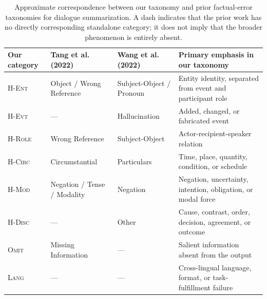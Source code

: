 \documentclass[11pt]{article}
\begin{document}
\begin{table}[t]
\centering
\scriptsize
\setlength{\tabcolsep}{4pt}
\begin{tabularx}{\textwidth}{@{}lXXX@{}}
\toprule
Our category & Tang et al. (2022) & Wang et al. (2022) & Primary emphasis in our taxonomy \\
\midrule
\textsc{H-Ent}  & Object / Wrong Reference & Subject-Object / Pronoun & Entity identity, separated from event and participant role \\
\textsc{H-Evt}  & --- & Hallucination & Added, changed, or fabricated event \\
\textsc{H-Role} & Wrong Reference & Subject-Object & Actor-recipient-speaker relation \\
\textsc{H-Circ} & Circumstantial & Particulars & Time, place, quantity, condition, or schedule \\
\textsc{H-Mod}  & Negation / Tense / Modality & Negation & Negation, uncertainty, intention, obligation, or modal force \\
\textsc{H-Disc} & --- & Other & Cause, contrast, order, decision, agreement, or outcome \\
\textsc{Omit}   & Missing Information & --- & Salient information absent from the output \\
\textsc{Lang}   & --- & --- & Cross-lingual language, format, or task-fulfillment failure \\
\bottomrule
\end{tabularx}
\caption{Approximate correspondence between our taxonomy and prior factual-error taxonomies for dialogue summarization. A dash indicates that the prior work has no directly corresponding standalone category; it does not imply that the broader phenomenon is entirely absent.}
\label{tab:taxonomy-comparison}
\end{table}
\end{document}
